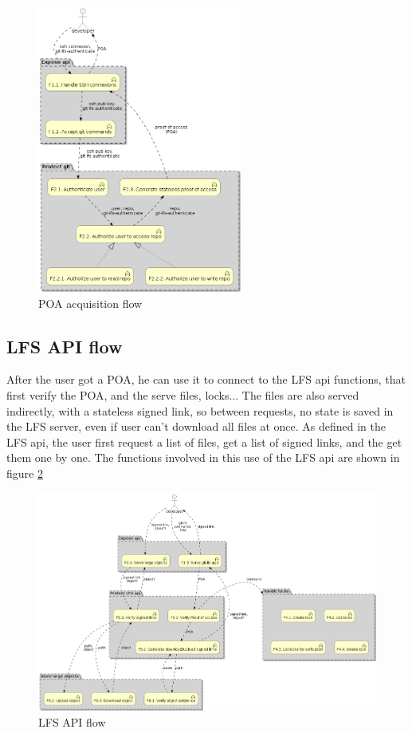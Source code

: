 \begin{figure}[ht]
    \centering
    \includegraphics[width=0.6\textwidth]{iteration_00/diagrams/POA_flow.png}
    \caption{POA acquisition flow}
    \label{fig:POA_flow}
\end{figure}

\newpage
\subsection{LFS API flow}

After the user got a POA, he can use it to connect to the LFS api functions, that first verify the POA, and the serve files, locks... The files are also served indirectly, with a stateless signed link, so between requests, no state is saved in the LFS server, even if user can't download all files at once. As defined in the LFS api, the user first request a list of files, get a list of signed links, and the get them one by one. The functions involved in this use of the LFS api are shown in figure \ref{fig:signed_link_flow}

\begin{figure}[ht]
    \centering
    \includegraphics[width=\textwidth]{iteration_00/diagrams/signed_link_flow.png}
    \caption{LFS API flow}
    \label{fig:signed_link_flow}
\end{figure}
